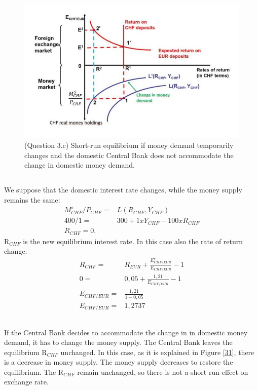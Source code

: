 \documentclass[	11pt, ]{fphw}
\begin{document}
\begin{figure}[h] 
\centering 
\includegraphics[scale=0.85]{32.JPG} 
\caption{(Question 3.c) Short-run equilibrium if money demand temporarily changes and the domestic Central Bank does not accommodate the change in domestic money demand. } 
\label{32}
\end{figure}

\subsection{}
We suppose that the domestic interest rate changes, while the money supply remains the same: 
\begin{align}
    M_{CHF}^{s}/P_{CHF} = & L ( R_{CHF}, Y_{CHF} ) \\
400/1= & 300 + 1 x  Y_{CHF} - 100 x R_{CHF} \\
R_{CHF} =0.
\end{align}
R$_{CHF}$ is the new equilibrium interest rate. In this case also the rate of return change: 
\begin{align}
 R_{CHF}= & R_{EUR} + \frac{E_{CHF/EUR}^{e}}{E_{CHF/EUR}} -1 \\
0   = & 0,05+ \frac{1,21}{E_{CHF/EUR}} -1 \\
E_{CHF/EUR}= & \frac{1,21}{1-0,05} \\
E_{CHF/EUR}= & 1,2737
\end{align}

\newpage 

\subsection{}
If the Central Bank decides to accommodate the change in in domestic money demand, it has to change the money supply. The Central Bank leaves the equilibrium R$_{CHF}$ unchanged.
In this case, as it is explained in Figure \vref{31}, there is a decrease in money supply.
The money supply decreases to restore the equilibrium. The R$_{CHF}$ remain unchanged, so there is not a short run effect on exchange rate.
\end{document}
